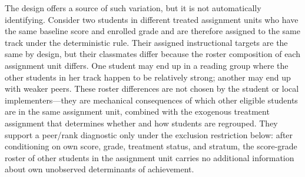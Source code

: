 \documentclass[11pt]{article}
\begin{document}
The design offers a source of such variation, but it is not automatically identifying. Consider two students in different treated assignment units who have the same baseline score and enrolled grade and are therefore assigned to the same track under the deterministic rule. Their assigned instructional targets are the same by design, but their classmates differ because the roster composition of each assignment unit differs. One student may end up in a reading group where the other students in her track happen to be relatively strong; another may end up with weaker peers. These roster differences are not chosen by the student or local implementers---they are mechanical consequences of which other eligible students are in the same assignment unit, combined with the exogenous treatment assignment that determines whether and how students are regrouped. They support a peer/rank diagnostic only under the exclusion restriction below: after conditioning on own score, grade, treatment status, and stratum, the score-grade roster of other students in the assignment unit carries no additional information about own unobserved determinants of achievement.
\end{document}
